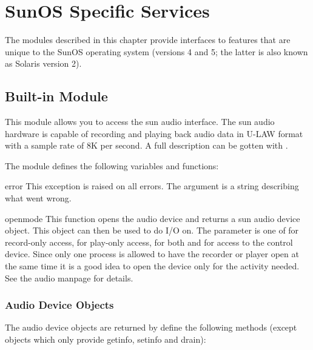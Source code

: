 \chapter{SunOS Specific Services}

The modules described in this chapter provide interfaces to features
that are unique to the SunOS operating system (versions 4 and 5; the
latter is also known as Solaris version 2).

\section{Built-in Module }

This module allows you to access the sun audio interface. The sun
audio hardware is capable of recording and playing back audio data
in U-LAW format with a sample rate of 8K per second. A full
description can be gotten with .

The module defines the following variables and functions:

\renewcommand{\indexsubitem}{(in module sunaudiodev)}
\begin{excdesc}{error}
This exception is raised on all errors. The argument is a string
describing what went wrong.
\end{excdesc}

\begin{funcdesc}{open}{mode}
This function opens the audio device and returns a sun audio device
object. This object can then be used to do I/O on. The  parameter
is one of  for record-only access,  for play-only
access,  for both and  for access to the
control device. Since only one process is allowed to have the recorder
or player open at the same time it is a good idea to open the device
only for the activity needed. See the audio manpage for details.
\end{funcdesc}

\subsection{Audio Device Objects}

The audio device objects are returned by  define the
following methods (except  objects which only provide
getinfo, setinfo and drain):

\renewcommand{\indexsubitem}{(audio device method)}

